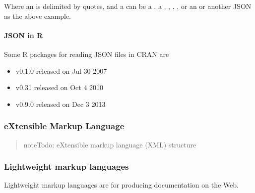 \documentclass[a4paper,12pt,english]{sphinxhowto}
\begin{document}
Where an  is delimited by quotes, and a  can be a , a , , , ,
or an  or another JSON  as the above example.


\paragraph{JSON in R}
\label{\detokenize{DDHH:json-in-r}}
Some R packages for reading JSON files in CRAN are
\begin{itemize}
\item {} 
 v0.1.0    released on Jul 30  2007

\item {} 
 v0.3\sphinxhyphen{}1  released on Oct  4  2010

\item {} 
 v0.9.0 released on Dec  3  2013

\end{itemize}



\subsubsection{eXtensible Markup Language}
\label{\detokenize{DDHH:extensible-markup-language}}\label{\detokenize{DDHH:xml-str}}\begin{quote}

\begin{sphinxadmonition}{note}{\label{\detokenize{DDHH:id1}}Todo:}
eXtensible markup language (XML) structure
\end{sphinxadmonition}
\end{quote}



\subsubsection{Lightweight markup languages}
\label{\detokenize{DDHH:lightweight-markup-languages}}\label{\detokenize{DDHH:rst-str}}
Lightweight markup languages are for producing documentation on the Web.
\end{document}
